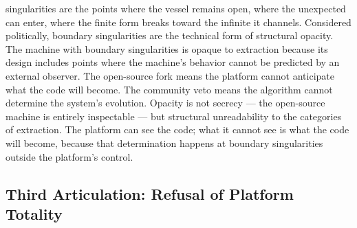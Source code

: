 singularities are the points where the vessel remains open, where the unexpected can enter, where the finite form breaks toward the infinite it channels. Considered politically, boundary singularities are the technical form of structural opacity. The machine with boundary singularities is opaque to extraction because its design includes points where the machine’s behavior cannot be predicted by an external observer. The open-source fork means the platform cannot anticipate what the code will become. The community veto means the algorithm cannot determine the system’s evolution. Opacity is not secrecy — the open-source machine is entirely inspectable — but structural unreadability to the categories of extraction. The platform can see the code; what it cannot see is what the code will become, because that determination happens at boundary singularities outside the platform’s control.

\subsection{Third Articulation: Refusal of Platform Totality}

